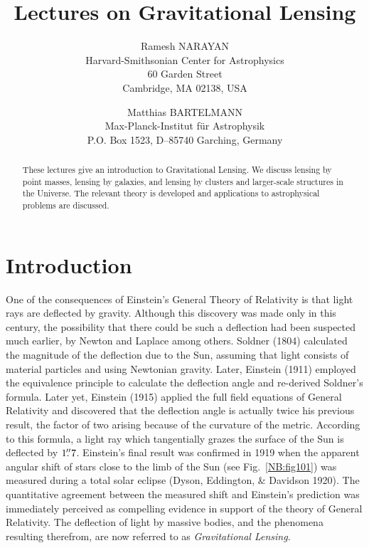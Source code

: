 \documentclass[a4paper,10pt]{article} %
\newcommand{\farcs}{\hbox{$.\!\!^{\prime\prime}$}}
\begin{document}
\title{Lectures on Gravitational Lensing} %

\author %
	{Ramesh NARAYAN \\
	Harvard-Smithsonian Center for Astrophysics \\
	60 Garden Street \\
	Cambridge, MA 02138, USA \\
	\and
	Matthias BARTELMANN \\
	Max-Planck-Institut f\"ur Astrophysik \\
	P.O. Box 1523, D--85740 Garching, Germany}

\maketitle %

\begin{abstract}
These lectures give an introduction to Gravitational Lensing. We
discuss lensing by point masses, lensing by galaxies, and lensing by
clusters and larger-scale structures in the Universe. The relevant
theory is developed and applications to astrophysical problems are
discussed.
\end{abstract}

\setcounter{tocdepth}{2}\clearpage\tableofcontents\clearpage %


\section{Introduction}
\label{NB:sect1}

One of the consequences of Einstein's General Theory of Relativity is
that light rays are deflected by gravity. Although this discovery was
made only in this century, the possibility that there could be such a
deflection had been suspected much earlier, by Newton and Laplace
among others. Soldner (1804) calculated the magnitude of the
deflection due to the Sun, assuming that light consists of material
particles and using Newtonian gravity. Later, Einstein (1911) employed
the equivalence principle to calculate the deflection angle and
re-derived Soldner's formula. Later yet, Einstein (1915) applied the
full field equations of General Relativity and discovered that the
deflection angle is actually twice his previous result, the factor of
two arising because of the curvature of the metric. According to this
formula, a light ray which tangentially grazes the surface of the Sun
is deflected by $1\farcs7$. Einstein's final result was confirmed in
1919 when the apparent angular shift of stars close to the limb of the
Sun (see Fig.\ \ref{NB:fig101}) was measured during a total solar
eclipse (Dyson, Eddington, \& Davidson 1920). The quantitative
agreement between the measured shift and Einstein's prediction was
immediately perceived as compelling evidence in support of the theory
of General Relativity. The deflection of light by massive bodies, and
the phenomena resulting therefrom, are now referred to as {\em
Gravitational Lensing\/}.
\end{document}
